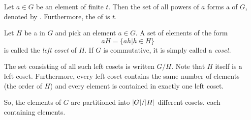 \begin{lemma}
  Let $a \in G$ be an element of finite  $t$.
  Then the set of all powers of $a$ forms a   of $G$, denoted by .
  Furthermore, the  of  is $t$.
\end{lemma}

\begin{definition}\label{def:Left_Coset}
  Let $H$ be a  in $G$ and pick an element $a \in G$.
  A set of elements of the form
  \begin{equation}\label{eq:Left_Coset}
    aH = \lbrace ah \vert h \in H \rbrace
  \end{equation}
  is called the \emph{left coset} of $H$.
  If $G$ is commutative, it is simply called a \emph{coset}.

  The set consisting of all such left cosets is written $G/H$.
  Note that $H$ itself is a left coset.
  Furthermore, every left coset contains the same number of elements (the order of $H$) and every element is contained in exactly one left coset.

  So, the elements of $G$ are partitioned into $\lvert G \rvert / \lvert H \rvert$ different cosets, each containing  elements.
\end{definition}

